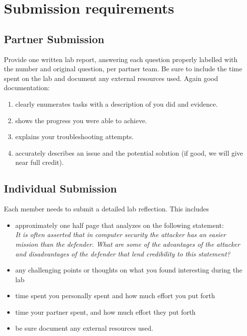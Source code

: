 \documentclass{article}
\begin{document}
\section{Submission requirements}

\subsection{Partner Submission}
Provide one written lab report, answering each question properly labelled with the number and original question, per partner team. Be sure to include the time spent on the lab and document any external resources used. 
Again good documentation: 
\begin{enumerate}
\item clearly enumerates tasks with a description of you did and evidence.  
\item shows the progress you were able to achieve.
\item explains your troubleshooting attempts.
\item accurately describes an issue and the potential solution (if good, we will give near full credit).
\end{enumerate}


\subsection{Individual Submission}
Each member needs to submit a detailed lab reflection. This includes 
\begin{itemize}
\item approximately one half page that analyzes on the following statement:\\

\textit{It is often asserted that in computer security the attacker has an easier mission than the defender. What are some of the advantages of the attacker and disadvantages of the defender that lend credibility to this statement?}\\
\item any challenging points or thoughts on what you found interesting during the lab 
\item time spent you personally spent and how much effort you put forth
\item time your partner spent, and how much effort they put forth
\item be sure document any external resources used. 
\end{itemize}
\end{document}
